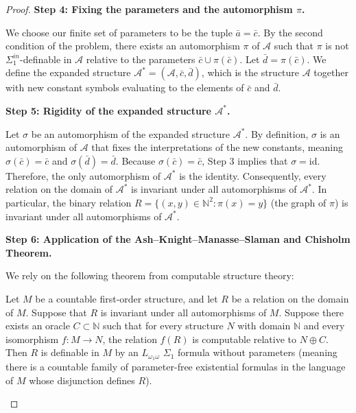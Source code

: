 \begin{proof}
\textbf{Step 4: Fixing the parameters and the automorphism $\pi$.}

We choose our finite set of parameters to be the tuple $\bar{a} = \bar{c}$. By the second condition of the problem, there exists an automorphism $\pi$ of $\mathcal{A}$ such that $\pi$ is not $\Sigma^{in}_1$-definable in $\mathcal{A}$ relative to the parameters $\bar{c} \cup \pi(\bar{c})$. 
Let $\bar{d} = \pi(\bar{c})$. 
We define the expanded structure $\mathcal{A}^* = (\mathcal{A}, \bar{c}, \bar{d})$, which is the structure $\mathcal{A}$ together with new constant symbols evaluating to the elements of $\bar{c}$ and $\bar{d}$. 

\textbf{Step 5: Rigidity of the expanded structure $\mathcal{A}^*$.}

Let $\sigma$ be an automorphism of the expanded structure $\mathcal{A}^*$. By definition, $\sigma$ is an automorphism of $\mathcal{A}$ that fixes the interpretations of the new constants, meaning $\sigma(\bar{c}) = \bar{c}$ and $\sigma(\bar{d}) = \bar{d}$. 
Because $\sigma(\bar{c}) = \bar{c}$, Step 3 implies that $\sigma = \mathrm{id}$. 
Therefore, the only automorphism of $\mathcal{A}^*$ is the identity. Consequently, every relation on the domain of $\mathcal{A}^*$ is invariant under all automorphisms of $\mathcal{A}^*$. 
In particular, the binary relation $R = \{(x, y) \in \mathbb{N}^2 : \pi(x) = y\}$ (the graph of $\pi$) is invariant under all automorphisms of $\mathcal{A}^*$.

\textbf{Step 6: Application of the Ash--Knight--Manasse--Slaman and Chisholm Theorem.}

We rely on the following theorem from computable structure theory:
\begin{theorem*}
Let $M$ be a countable first-order structure, and let $R$ be a relation on the domain of $M$. Suppose that $R$ is invariant under all automorphisms of $M$. Suppose there exists an oracle $C \subset \mathbb{N}$ such that for every structure $N$ with domain $\mathbb{N}$ and every isomorphism $f: M \to N$, the relation $f(R)$ is computable relative to $N \oplus C$. Then $R$ is definable in $M$ by an $L_{\omega_1\omega}$ $\Sigma_1$ formula without parameters (meaning there is a countable family of parameter-free existential formulas in the language of $M$ whose disjunction defines $R$).
\end{theorem*}


\end{proof}
